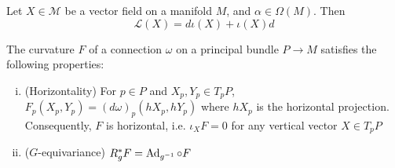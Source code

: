 \begin{thm} 
	\label{thm:cartan_homotopy} %
	Let $X\in \mathcal{M}$ be a vector field on a manifold $M$, and 
	$\alpha\in \Omega(M)$. Then
	\[
	\mathcal{L}(X) = d\iota(X)+\iota(X) d
	\] 
	\begin{comment}
	\begin{enumerate}[(i)]
	    \item $\mathcal{L}(X)d = d\mathcal{L}(X)$
		\item $\mathcal{L}(X)(\iota(Y)\alpha) = \iota([X,Y])\alpha +
			\iota(Y)(\mathcal{L}(X)\alpha)$ 
		\item Cartan's homotopy formula: $\mathcal{L}(X) = d
			\cdot\iota(X)+\iota(X)\cdot d$
	\end{enumerate}
	\end{comment}
\end{thm}

\begin{thm} \label{thm:pb_curvature_properties}
	The curvature $F$ of a connection  $\omega$ on a principal  bundle $P\to M$
	satisfies the following properties:
	\begin{enumerate}[(i)]
	    \item (Horizontality) For $p\in P$ and  $X_p,Y_p\in T_pP$,  $F_p(X_p,Y_p) =
			(d\omega)_p(hX_p,hY_p)$ where $hX_p$ is the horizontal projection.
		Consequently, $F$ is horizontal, i.e. $\iota_X F = 0$ for any vertical
		 vector  $X\in T_pP$
		\item ($G$-equivariance) $R_g^*F = \operatorname{Ad}_{g^{-1}}\circ F$
	\end{enumerate}
\end{thm}

